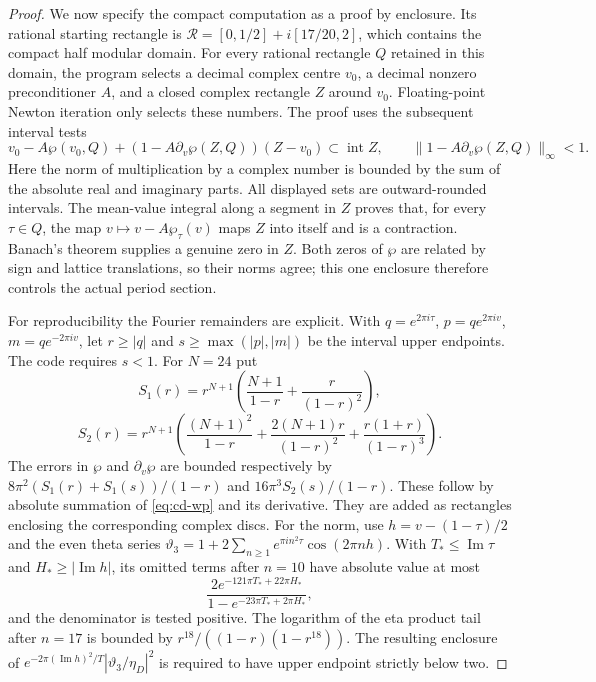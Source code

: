 \begin{proof}
We now specify the compact computation as a proof by enclosure.
Its rational starting rectangle is
$\mathcal R=[0,1/2]+i[17/20,2]$, which contains the compact half modular
domain. For every rational rectangle $Q$ retained in this domain, the
program selects a decimal complex centre $v_0$, a decimal nonzero
preconditioner $A$, and a closed complex rectangle $Z$ around $v_0$.
Floating-point Newton iteration only selects these numbers. The proof
uses the subsequent interval tests
\[
 v_0-A\wp(v_0,Q)+(1-A\partial_v\wp(Z,Q))(Z-v_0)
       \subset\operatorname{int}Z,
 \qquad
 \|1-A\partial_v\wp(Z,Q)\|_\infty<1.
\]
Here the norm of multiplication by a complex number is bounded by the
sum of the absolute real and imaginary parts. All displayed sets are
outward-rounded intervals. The mean-value integral along a segment in
$Z$ proves that, for every $\tau\in Q$, the map
$v\mapsto v-A\wp_\tau(v)$ maps $Z$ into itself and is a contraction.
Banach's theorem supplies a genuine zero in $Z$. Both zeros of $\wp$
are related by sign and lattice translations, so their norms agree;
this one enclosure therefore controls the actual period section.

For reproducibility the Fourier remainders are explicit. With
$q=e^{2\pi i\tau}$, $p=q e^{2\pi iv}$, $m=q e^{-2\pi iv}$, let
$r\geq|q|$ and $s\geq\max(|p|,|m|)$ be the interval upper endpoints.
The code requires $s<1$. For $N=24$ put
\[
 S_1(r)=r^{N+1}\left(\frac{N+1}{1-r}+\frac r{(1-r)^2}\right),
\]
\[
 S_2(r)=r^{N+1}\left(\frac{(N+1)^2}{1-r}+
 \frac{2(N+1)r}{(1-r)^2}+\frac{r(1+r)}{(1-r)^3}\right).
\]
The errors in $\wp$ and $\partial_v\wp$ are bounded respectively by
$8\pi^2(S_1(r)+S_1(s))/(1-r)$ and $16\pi^3S_2(s)/(1-r)$.
These follow by absolute summation of \eqref{eq:cd-wp} and its derivative.
They are added as rectangles enclosing the corresponding complex discs.
For the norm, use $h=v-(1-\tau)/2$ and the even theta series
$\vartheta_3=1+2\sum_{n\geq1}e^{\pi i n^2\tau}\cos(2\pi nh)$.
With $T_*\leq\operatorname{Im}\tau$ and $H_*\geq|\operatorname{Im}h|$,
its omitted terms after $n=10$ have absolute value at most
\[
 \frac{2e^{-121\pi T_*+22\pi H_*}}
 {1-e^{-23\pi T_*+2\pi H_*}},
\]
and the denominator is tested positive. The logarithm of the eta
product tail after $n=17$ is bounded by
$r^{18}/((1-r)(1-r^{18}))$. The resulting enclosure of
$e^{-2\pi(\operatorname{Im}h)^2/T}|\vartheta_3/\eta_D|^2$
is required to have upper endpoint strictly below two.


\end{proof}
